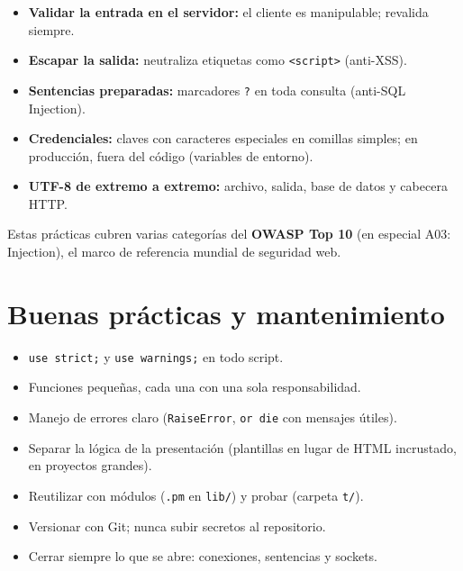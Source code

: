 \documentclass[11pt]{article}
\begin{document}
\begin{itemize}[leftmargin=1.4em,itemsep=2pt,topsep=2pt]
\item \textbf{Validar la entrada en el servidor:} el cliente es manipulable; revalida siempre.
\item \textbf{Escapar la salida:} neutraliza etiquetas como \texttt{\textless{}script\textgreater{}} (anti-XSS).
\item \textbf{Sentencias preparadas:} marcadores \texttt{?} en toda consulta (anti-SQL Injection).
\item \textbf{Credenciales:} claves con caracteres especiales en comillas simples; en producción, fuera del código (variables de entorno).
\item \textbf{UTF-8 de extremo a extremo:} archivo, salida, base de datos y cabecera HTTP.
\end{itemize}
Estas prácticas cubren varias categorías del \textbf{OWASP Top 10} (en especial A03: Injection), el marco de referencia mundial de seguridad web.

\section{Buenas prácticas y mantenimiento}
\begin{itemize}[leftmargin=1.4em,itemsep=2pt,topsep=2pt]
\item \texttt{use strict;} y \texttt{use warnings;} en todo script.
\item Funciones pequeñas, cada una con una sola responsabilidad.
\item Manejo de errores claro (\texttt{RaiseError}, \texttt{or die} con mensajes útiles).
\item Separar la lógica de la presentación (plantillas en lugar de HTML incrustado, en proyectos grandes).
\item Reutilizar con módulos (\texttt{.pm} en \texttt{lib/}) y probar (carpeta \texttt{t/}).
\item Versionar con Git; nunca subir secretos al repositorio.
\item Cerrar siempre lo que se abre: conexiones, sentencias y sockets.
\end{itemize}
\end{document}
